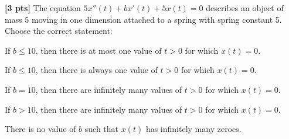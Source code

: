 \documentclass[11pt]{article}
\begin{document}
\begin{problem}
\textbf{[3 pts]} The equation $5x'' (t) + bx' (t) + 5x(t) = 0$ describes an object of mass 5 moving in one
dimension attached to a spring with spring constant 5. Choose the correct statement:
\begin{multchoice}
     \item If $b \leq 10$, then there is at most one value of $t > 0$ for which $x(t) = 0$.
     \item If $b \leq 10$, then there is always one value of $t > 0$ for which $x(t) = 0$.
     \item If $b = 10$, then there are infinitely many values of $t > 0$ for which $x(t) = 0$.
     \item If $b > 10$, then there are infinitely many values of $t > 0$ for which $x(t) = 0$.
     \item There is no value of $b$ such that $x(t)$ has infinitely many zeroes.
\end{multchoice}
\end{problem}








\end{document}

